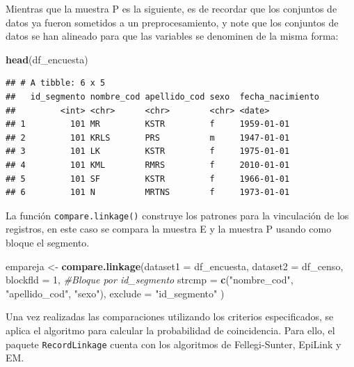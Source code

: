 \documentclass[
  12pt,
]{book}
\newenvironment{Shaded}{\begin{snugshade}}{\end{snugshade}}
\newcommand{\AttributeTok}[1]{\textcolor[rgb]{0.13,0.29,0.53}{#1}}
\newcommand{\CommentTok}[1]{\textcolor[rgb]{0.56,0.35,0.01}{\textit{#1}}}
\newcommand{\DecValTok}[1]{\textcolor[rgb]{0.00,0.00,0.81}{#1}}
\newcommand{\FunctionTok}[1]{\textcolor[rgb]{0.13,0.29,0.53}{\textbf{#1}}}
\newcommand{\NormalTok}[1]{#1}
\newcommand{\OtherTok}[1]{\textcolor[rgb]{0.56,0.35,0.01}{#1}}
\newcommand{\StringTok}[1]{\textcolor[rgb]{0.31,0.60,0.02}{#1}}
\begin{document}
Mientras que la muestra P es la siguiente, es de recordar que los conjuntos de datos ya fueron sometidos a un preprocesamiento, y note que los conjuntos de datos se han alineado para que las variables se denominen de la misma forma:

\begin{Shaded}
\begin{Highlighting}[]
\FunctionTok{head}\NormalTok{(df\_encuesta)}
\end{Highlighting}
\end{Shaded}

\begin{verbatim}
## # A tibble: 6 x 5
##   id_segmento nombre_cod apellido_cod sexo  fecha_nacimiento
##         <int> <chr>      <chr>        <chr> <date>          
## 1         101 MR         KSTR         f     1959-01-01      
## 2         101 KRLS       PRS          m     1947-01-01      
## 3         101 LK         KSTR         f     1975-01-01      
## 4         101 KML        RMRS         f     2010-01-01      
## 5         101 SF         KSTR         f     1966-01-01      
## 6         101 N          MRTNS        f     1973-01-01
\end{verbatim}

La función \texttt{compare.linkage()} construye los patrones para la vinculación de los registros, en este caso se compara la muestra E y la muestra P usando como bloque el segmento.

\begin{Shaded}
\begin{Highlighting}[]
\NormalTok{empareja }\OtherTok{\textless{}{-}} \FunctionTok{compare.linkage}\NormalTok{(}\AttributeTok{dataset1 =}\NormalTok{ df\_encuesta,}
                            \AttributeTok{dataset2 =}\NormalTok{ df\_censo,}
                            \AttributeTok{blockfld =} \DecValTok{1}\NormalTok{, }\CommentTok{\#Bloque por id\_segmento}
                            \AttributeTok{strcmp =} \FunctionTok{c}\NormalTok{(}\StringTok{"nombre\_cod"}\NormalTok{, }\StringTok{"apellido\_cod"}\NormalTok{, }\StringTok{"sexo"}\NormalTok{),}
                            \AttributeTok{exclude =} \StringTok{"id\_segmento"}
\NormalTok{                            )}
\end{Highlighting}
\end{Shaded}

Una vez realizadas las comparaciones utilizando los criterios especificados, se aplica el algoritmo para calcular la probabilidad de coincidencia. Para ello, el paquete \texttt{RecordLinkage} cuenta con los algoritmos de Fellegi-Sunter, EpiLink y EM.
\end{document}
